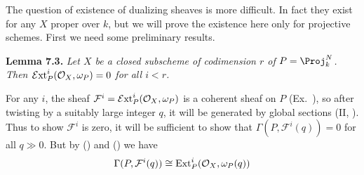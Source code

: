 {\smallskip
The question of existence of dualizing sheaves is more difficult. In fact they exist for any $X$ proper over $k$, but we will prove the existence here only for projective schemes. First we need some preliminary results.

\medskip
\noindent\hypertarget{result-III-7.3}{}\textbf{Lemma 7.3.} \emph{Let $X$ be a closed subscheme of codimension $r$ of $P=\Proj_k^N$. Then $\operatorname{\mathcal E xt}_P^i(\mathcal O_X,\omega_P)=0$ for all $i<r$.}

\Proof For any $i$, the sheaf $\mathcal F^i=\operatorname{\mathcal E xt}_P^i(\mathcal O_X,\omega_P)$ is a coherent sheaf on $P$ (Ex.~), so after twisting by a suitably large integer $q$, it will be generated by global sections (II, ). Thus to show $\mathcal F^i$ is zero, it will be sufficient to show that $\Gamma(P,\mathcal F^i(q))=0$ for all $q\gg0$. But by () and () we have
\[
\Gamma(P,\mathcal F^i(q))\cong\operatorname{Ext}_P^i(\mathcal O_X,\omega_P(q))
\]
}
